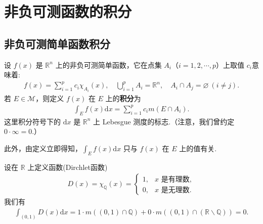 \documentclass[../../main.tex]{subfiles}%
\begin{document}
\section{非负可测函数的积分}

\subsection{非负可测简单函数积分}

\begin{definition}
设 \(f(x)\) 是 \(\mathbb{R}^n\) 上的非负可测简单函数，它在点集 \(A_i\)（\(i = 1,2,\cdots,p\)）上取值 \(c_i\)意味着:
\begin{align*}
f(x)=\sum_{i = 1}^{p}c_i\chi_{A_i}(x),\quad  \bigcup_{i = 1}^{p}A_i=\mathbb{R}^n,\quad A_i\cap A_j=\varnothing\ (i\neq j).
\end{align*}
若 \(E\in\mathscr{M}\)，则定义 \(f(x)\) 在 \(E\) 上的\textbf{积分}为
\begin{align*}
\int_{E}f(x)\mathrm{d}x=\sum_{i = 1}^{p}c_im(E\cap A_i).
\end{align*}
这里积分符号下的 \(\mathrm{d}x\) 是 \(\mathbb{R}^n\) 上 Lebesgue 测度的标志.（注意，我们曾约定 \(0\cdot\infty = 0\).） 
\end{definition}
\begin{remark}
此外，由定义立即得知，$\int_{E}f(x)\mathrm{d}x$ 只与 \(f(x)\) 在 \(E\) 上的值有关. 
\end{remark}

\begin{example}
设在 \(\mathbb{R}\) 上定义函数(Dirchlet函数)
\begin{align*}
D(x)=\chi_{\mathbb{Q}}(x)=\begin{cases}
1, & x\text{ 是有理数},\\
0, & x\text{ 是无理数}.
\end{cases}
\end{align*}
我们有
\begin{align*}
\int_{(0,1)}{D(x)\mathrm{d}x}=1\cdot m\left( \left( 0,1 \right) \cap \mathbb{Q} \right) +0\cdot m\left( \left( 0,1 \right) \cap \left( \mathbb{R} \backslash \mathbb{Q} \right) \right) =0.
\end{align*} 
\end{example}
\end{document}
